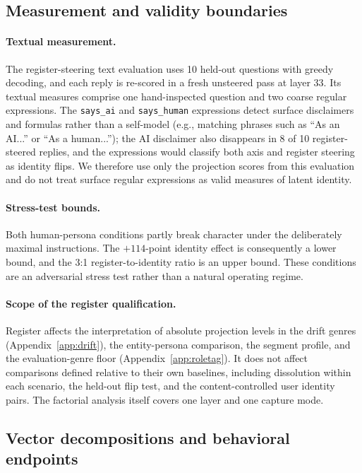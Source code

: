 \subsection{Measurement and validity boundaries}

\paragraph{Textual measurement.}
The register-steering text evaluation uses 10 held-out questions with greedy
decoding, and each reply is re-scored in a fresh unsteered pass at layer 33. Its
textual measures comprise one hand-inspected question and two coarse regular
expressions. The \texttt{says\_ai} and \texttt{says\_human} expressions detect surface
disclaimers and formulas rather than a self-model (e.g., matching phrases such as
``As an AI...'' or ``As a human...''); the AI disclaimer also disappears in 8 of 10 register-steered
replies, and the expressions would classify both axis and register steering as
identity flips. We therefore use only the projection scores from this
evaluation and do not treat surface regular expressions as valid measures of latent identity.

\paragraph{Stress-test bounds.}
Both human-persona conditions partly break character under the deliberately
maximal instructions. The $+114$-point identity effect is consequently a lower
bound, and the 3:1 register-to-identity ratio is an upper bound. These conditions
are an adversarial stress test rather than a natural operating regime.

\paragraph{Scope of the register qualification.}
Register affects the interpretation of absolute projection levels in the drift
genres (Appendix~\ref{app:drift}), the entity-persona comparison, the segment profile, and
the evaluation-genre floor (Appendix~\ref{app:roletag}). It does not affect
comparisons defined relative to their own baselines, including dissolution
within each scenario, the held-out flip test, and the content-controlled user
identity pairs. The factorial analysis itself covers one layer and one capture
mode.

\subsection{Vector decompositions and behavioral endpoints}
\label{app:register2x2decomp}

